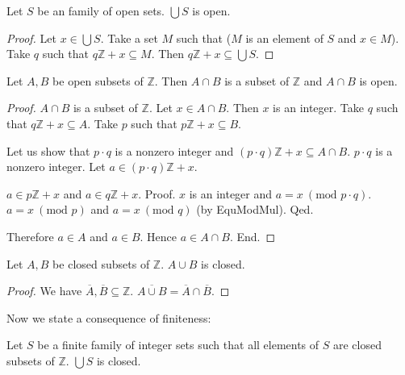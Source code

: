 \documentclass[english]{article}
\renewcommand{\mod}{\text{mod }}
\newcommand{\Int}{\mathbb{Z}}
\begin{document}
  \begin{forthel}
    \begin{lemma}\label{UnionOpen}
      Let $S$ be an family of open sets.
      $\bigcup S$ is open.
    \end{lemma}
    \begin{proof}
      Let $x \in \bigcup S$.
      Take a set $M$ such that ($M$ is an element of $S$ and $x \in M$).
      Take $q$ such that $q \Int + x \subseteq M$.
      Then $q \Int + x \subseteq \bigcup S$.
    \end{proof}

    \begin{lemma}\label{InterOpen}
      Let $A,B$ be open subsets of $\Int$.
      Then $A \cap B$ is a subset of $\Int$ and $A \cap B$ is open.
    \end{lemma}
    \begin{proof}
      $A \cap B$ is a subset of $\Int$.
      Let $x \in A \cap B$.
      Then $x$ is an integer.
      Take $q$ such that $q \Int + x \subseteq A$.
      Take $p$ such that $p \Int + x \subseteq B$.

      Let us show that $p \cdot q$ is a nonzero integer and $(p \cdot q) \Int + x \subseteq A \cap B$.
        $p \cdot q$ is a nonzero integer.
        Let $a \in (p \cdot q) \Int + x$.

        $a \in p \Int + x$ and $a \in q \Int + x$. \newline
        Proof.
          $x$ is an integer and $a = x ~(\mod p \cdot q)$.
          $a = x ~(\mod p)$ and $a = x ~(\mod q)$ (by EquModMul).
        Qed.

        Therefore $a \in A$ and $a \in B$.
        Hence $a \in A \cap B$.
      End.
    \end{proof}

    \begin{lemma}\label{UnionClosed}
      Let $A,B$ be closed subsets of $\Int$.
      $A \cup B$ is closed.
    \end{lemma}
    \begin{proof}
      We have $\overline{A}, \overline{B} \subseteq \Int$.
      $\overline{A \cup B} = \overline{A} \cap \overline{B}$.
    \end{proof}
  \end{forthel}

  Now we state a consequence of finiteness:

  \begin{forthel}
    \begin{axiom}\label{UnionSClosed}
      Let $S$ be a finite family of integer sets such that all elements of $S$ are closed subsets of $\Int$.
      $\bigcup S$ is closed.
    \end{axiom}
  \end{forthel}
\end{document}
